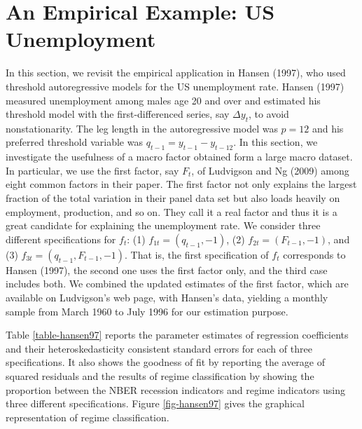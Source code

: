 \documentclass[12pt, reqno]{amsart}
\begin{document}
\onehalfspacing

\section*{An Empirical Example: US Unemployment}

In this section, we revisit the empirical application in Hansen (1997), who used threshold autoregressive models for the US unemployment rate. 
Hansen (1997) measured unemployment among males age 20 and over and estimated his threshold model with the first-differenced series, say $\Delta y_t$, to avoid nonstationarity. The leg length in the autoregressive model was $p=12$ and his preferred threshold variable was 
$q_{t-1} = y_{t-1} - y_{t-12}$. In this section, we investigate the usefulness of a macro factor obtained form a large macro dataset.
In particular, we use the first factor, say $F_t$, of Ludvigson and Ng (2009) among eight common factors in their paper.
The first factor not only explains the largest fraction of the total variation in their panel data set but also loads heavily on employment, production, and so on. They call it a real factor and thus it is a great candidate for explaining the unemployment rate. 
We consider three different specifications for $f_t$: (1) $f_{1t} = (q_{t-1}, -1)$, (2) $f_{2t} = (F_{t-1}, -1)$, and (3) $f_{3t} = (q_{t-1}, F_{t-1}, -1)$.
That is, the first specification of $f_t$ corresponds to Hansen (1997), the second one  uses the first factor only, and the third case includes both. 
We combined the updated estimates of the first factor, which are available on Ludvigson's web page,
with Hansen's data, yielding a monthly sample from March 1960 to July 1996  for our estimation purpose. 

Table \ref{table-hansen97} reports the parameter estimates of regression coefficients and their  heteroskedasticity consistent standard errors for each of three specifications. It also shows the goodness of fit by reporting the average of squared residuals and the results of regime classification by showing the proportion between
the NBER recession indicators and regime indicators using three different specifications.   
Figure \ref{fig-hansen97} gives the graphical representation of regime classification. 
\end{document}
